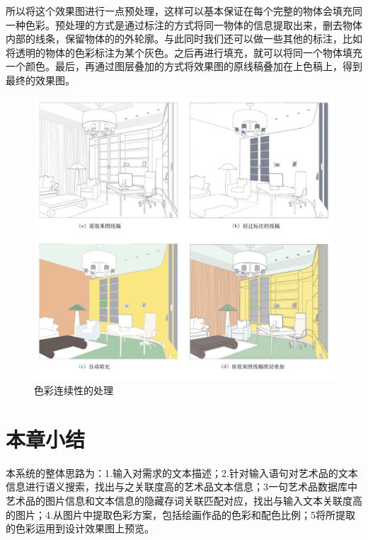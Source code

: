 所以将这个效果图进行一点预处理，这样可以基本保证在每个完整的物体会填充同一种色彩。预处理的方式是通过标注的方式将同一物体的信息提取出来，删去物体内部的线条，保留物体的的外轮廓。与此同时我们还可以做一些其他的标注，比如将透明的物体的色彩标注为某个灰色。之后再进行填充，就可以将同一个物体填充一个颜色。最后，再通过图层叠加的方式将效果图的原线稿叠加在上色稿上，得到最终的效果图。

\begin{figure}[!htbp]
\centering
\includegraphics[width=\linewidth,keepaspectratio]{data/chapter-1/预览2副本.jpg}
\caption{色彩连续性的处理}
\label{figure:漏掉上色面积的问题}
\end{figure}




\section{本章小结}

本系统的整体思路为：1.输入对需求的文本描述；2.针对输入语句对艺术品的文本信息进行语义搜索，找出与之关联度高的艺术品文本信息；3一句艺术品数据库中艺术品的图片信息和文本信息的隐藏存词关联匹配对应，找出与输入文本关联度高的图片；4.从图片中提取色彩方案，包括绘画作品的色彩和配色比例；5将所提取的色彩运用到设计效果图上预览。

